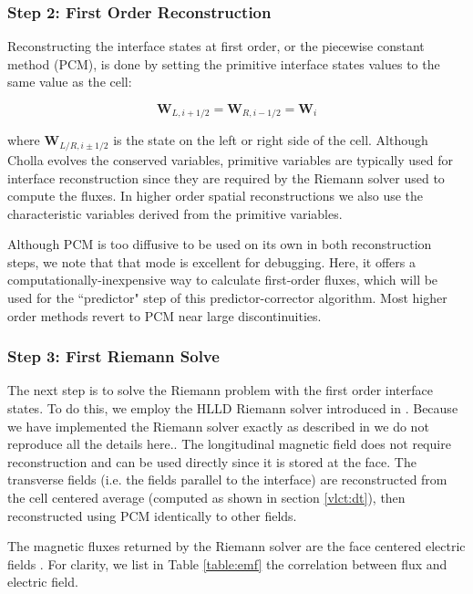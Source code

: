 \subsubsection{Step 2: First Order Reconstruction}
\label{vlct:first-order-reconstruction}

Reconstructing the interface states at first order, or the piecewise constant method (PCM), is done by setting the primitive interface states values to the same value as the cell:

\begin{equation}
    \boldsymbol{W}_{L, i+1/2} = \boldsymbol{W}_{R, i-1/2} = \boldsymbol{W}_{i}
\end{equation}

\noindent where $ \boldsymbol{W}_{L/R, i\pm1/2} $ is the state on the left or right side of the cell. Although Cholla evolves the conserved variables, primitive variables are typically used for interface reconstruction since they are required by the Riemann solver used to compute the fluxes. In higher order spatial reconstructions we also use the characteristic variables derived from the primitive variables.

Although PCM is too diffusive to be used on its own in both reconstruction steps, we note that that mode is excellent for debugging. Here, it offers a computationally-inexpensive way to calculate first-order fluxes, which will be used for the ``predictor" step of this predictor-corrector algorithm. Most higher order methods revert to PCM near large discontinuities.

\subsubsection{Step 3: First Riemann Solve}
\label{vlct:first-riemann-solve}

The next step is to solve the Riemann problem with the first order interface states. To do this, we employ the HLLD Riemann solver introduced in \cite{hlld_2005}. Because we have implemented the Riemann solver exactly as described in \cite{hlld_2005} we do not reproduce all the details here.. The longitudinal magnetic field does not require reconstruction and can be used directly since it is stored at the face. The transverse fields (i.e. the fields parallel to the interface) are reconstructed from the cell centered average (computed as shown in section \ref{vlct:dt}), then reconstructed using PCM identically to other fields.

The magnetic fluxes returned by the Riemann solver are the face centered electric fields \citep[see section 5.3 of][]{stone_athena_2008}. For clarity, we list in Table \ref{table:emf} the correlation between flux and electric field.

